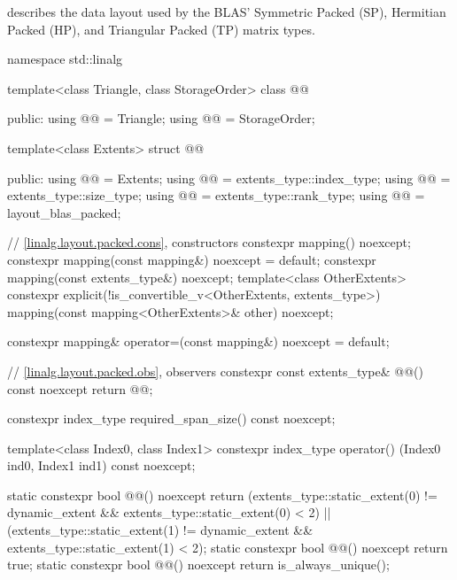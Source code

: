 \pnum
\begin{note}
 describes the data layout used by
the BLAS'
Symmetric Packed (SP), Hermitian Packed (HP), and Triangular Packed (TP)
matrix types.
\end{note}
\begin{codeblock}
namespace std::linalg {
  template<class Triangle, class StorageOrder>
  class @@ {
  public:
    using @@ = Triangle;
    using @@ = StorageOrder;

    template<class Extents>
    struct @@ {
    public:
      using @@ = Extents;
      using @@ = extents_type::index_type;
      using @@ = extents_type::size_type;
      using @@ = extents_type::rank_type;
      using @@ = layout_blas_packed;

      // \ref{linalg.layout.packed.cons}, constructors
      constexpr mapping() noexcept;
      constexpr mapping(const mapping&) noexcept = default;
      constexpr mapping(const extents_type&) noexcept;
      template<class OtherExtents>
        constexpr explicit(!is_convertible_v<OtherExtents, extents_type>)
          mapping(const mapping<OtherExtents>& other) noexcept;

      constexpr mapping& operator=(const mapping&) noexcept = default;

      // \ref{linalg.layout.packed.obs}, observers
      constexpr const extents_type& @@() const noexcept { return @@; }

      constexpr index_type required_span_size() const noexcept;

      template<class Index0, class Index1>
        constexpr index_type operator() (Index0 ind0, Index1 ind1) const noexcept;

      static constexpr bool @@() noexcept {
        return (extents_type::static_extent(0) != dynamic_extent &&
                extents_type::static_extent(0) < 2) ||
               (extents_type::static_extent(1) != dynamic_extent &&
                extents_type::static_extent(1) < 2);
      }
      static constexpr bool @@() noexcept { return true; }
      static constexpr bool @@() noexcept
        { return is_always_unique(); }

}}}
\end{codeblock}
